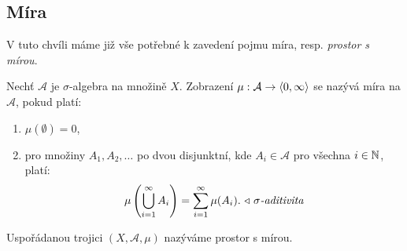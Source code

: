 \subsection{Míra}\label{subsec:mira}

V tuto chvíli máme již vše potřebné k zavedení pojmu míra, resp. \emph{prostor s mírou}.
\begin{definition}\label{def:prostor-s-mirou}
    Nechť $\mathcal{A}$ je $\sigma$-algebra na množině $X$. Zobrazení $\mu:\mathcal{A} \rightarrow \langle0,\infty\rangle$ se nazývá míra na $\mathcal{A}$, pokud platí:
    \begin{enumerate}[label=(\roman*)]
        \item $\mu(\emptyset)=0$,
        \item pro množiny $A_1,A_2,\dots$ po dvou disjunktní, kde $A_i\in\mathcal{A}$ pro všechna $i\in\mathbb{N}$, platí:
        \[\mu\left(\bigcup\limits_{i=1}^\infty A_i\right)=\sum_{i=1}^\infty\mu(A_i).\text{\rightnote{$\sigma$-aditivita}}\]
    \end{enumerate}
    Uspořádanou trojici $(X,\mathcal{A},\mu)$ nazýváme prostor s mírou.
\end{definition}